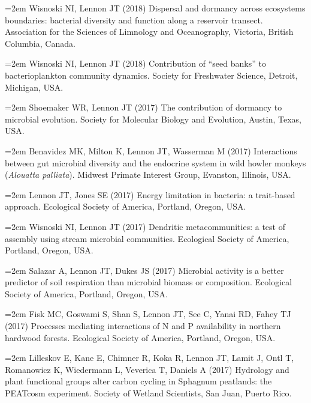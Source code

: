\documentclass[11pt]{article}
\begin{document}
{\hangindent=2em Wisnoski NI, Lennon JT (2018) Dispersal and dormancy across ecosystems boundaries: bacterial diversity and function along a reservoir transect. Association for the Sciences of Limnology and Oceanography, Victoria, British Columbia, Canada. \par

\hangindent=2em Wisnoski NI, Lennon JT (2018) Contribution of “seed banks” to bacterioplankton community dynamics. Society for Freshwater Science, Detroit, Michigan, USA. \par

\hangindent=2em Shoemaker WR, Lennon JT (2017) The contribution of dormancy to microbial evolution. Society for Molecular Biology and Evolution, Austin, Texas, USA. \par

\hangindent=2em Benavidez MK, Milton K, Lennon JT, Wasserman M (2017) Interactions between gut microbial diversity and the endocrine system in wild howler monkeys (\textit{Alouatta palliata}). Midwest Primate Interest Group, Evanston, Illinois, USA. \par

\hangindent=2em Lennon JT, Jones SE (2017) Energy limitation in bacteria: a trait-based approach. Ecological Society of America, Portland, Oregon, USA. \par

\hangindent=2em Wisnoski NI, Lennon JT (2017) Dendritic metacommunities: a test of assembly using stream microbial communities. Ecological Society of America, Portland, Oregon, USA. \par

\hangindent=2em Salazar A, Lennon JT, Dukes JS (2017) Microbial activity is a better predictor of soil respiration than microbial biomass or composition. Ecological Society of America, Portland, Oregon, USA. \par

\hangindent=2em Fisk MC, Goswami S, Shan S, Lennon JT, See C, Yanai RD, Fahey TJ (2017) Processes mediating interactions of N and P availability in northern hardwood forests. Ecological Society of America, Portland, Oregon, USA. \par

\hangindent=2em Lilleskov E, Kane E, Chimner R, Koka R, Lennon JT, Lamit J, Ontl T, Romanowicz K, Wiedermann L, Veverica T, Daniels A (2017) Hydrology and plant functional groups alter carbon cycling in Sphagnum peatlands: the PEATcosm experiment. Society of Wetland Scientists, San Juan, Puerto Rico. \par

}
\end{document}
